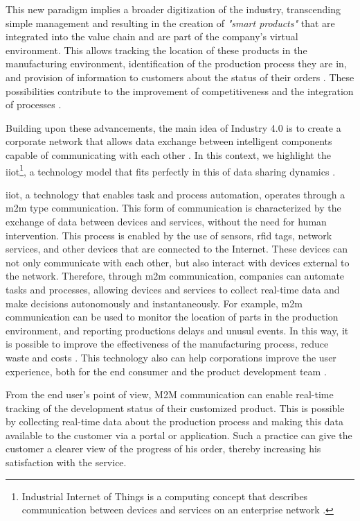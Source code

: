 This new paradigm implies a broader digitization of the industry, transcending simple management and resulting in the creation of \emph{"smart products"} that are integrated into the value chain and are part of the company's virtual environment. This allows tracking the location of these products in the manufacturing environment, identification of the production process they are in, and provision of information to customers about the status of their orders \cite{economies6030046}. These possibilities contribute to the improvement of competitiveness and the integration of processes \cite{SeungSME}.

Building upon these advancements, the main idea of Industry 4.0 is to create a corporate network that allows data exchange between intelligent components capable of communicating with each other \cite{Grabowska+2020+90+96}. In this context, we highlight the \acrfull{iiot}\footnote{Industrial Internet of Things is a computing concept that describes communication between devices and services on an enterprise network \cite{Sisinni8401919}.}, a technology model that fits perfectly in this  of data sharing dynamics \cite{GARG2022286}.


\acrfull{iiot}, a technology that enables task and process automation, operates through a \acrfull{m2m} type communication. This form of communication is characterized by the exchange of data between devices and services, without the need for human intervention. This process is enabled by the use of sensors, \acrfull{rfid} tags, network services, and other devices that are connected to the Internet. These devices can not only communicate with each other, but also interact with devices external to the network\cite{KhanIoT}. Therefore, through \acrshort{m2m} communication, companies can automate tasks and processes, allowing devices and services to collect real-time data and make decisions autonomously and instantaneously. For example, \acrshort{m2m} communication can be used to monitor the location of parts in the production environment, and reporting productions delays and unusul events. In this way, it is possible to improve the effectiveness of the manufacturing process, reduce waste and costs \cite{SeungSME}. This technology also can help corporations improve the user experience, both for the end consumer and the product development team \cite{Grabowska+2020+90+96}.

From the end user's point of view, M2M communication can enable real-time tracking of the development status of their customized product. This is possible by collecting real-time data about the production process and making this data available to the customer via a portal or application. Such a practice can give the customer a clearer view of the progress of his order, thereby increasing his satisfaction with the service.

